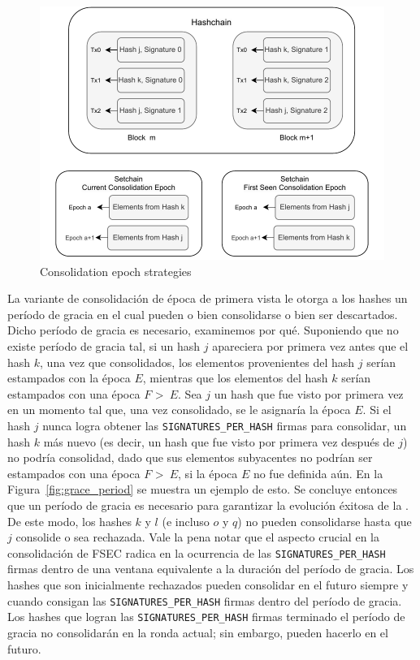 \begin{figure}
  \centering
  \includegraphics[scale=0.5]{figures/consolidation_epoch.pdf}
  \caption{Consolidation epoch strategies}
  \label{fig:consolidation_epoch}
\end{figure}

La variante de consolidación de época de primera vista le otorga a los hashes un período
de gracia en el cual pueden o bien consolidarse o bien ser descartados.
%
Dicho período de gracia es necesario, examinemos por qué.
Suponiendo que no existe período de gracia tal, si un hash $j$ apareciera por primera vez
antes que el hash $k$, una vez que consolidados, los elementos provenientes del hash $j$
serían estampados con la época $E$, mientras que los elementos del hash $k$ serían estampados
con una época $F$ \textgreater \ $E$.
%
Sea $j$ un hash que fue visto por primera vez en un momento tal que, una vez consolidado,
se le asignaría la época $E$.
%
Si el hash $j$ nunca logra obtener las \texttt{SIGNATURES\_PER\_HASH} firmas para
consolidar, un hash $k$ más nuevo (es decir, un hash que fue visto por primera vez
después de $j$) no podría consolidad, dado que sus elementos subyacentes no podrían ser
estampados con una época $F$ \textgreater \ $E$, si la época $E$ no fue definida aún.
%
En la Figura~\ref{fig:grace_period} se muestra un ejemplo de esto.
%
Se concluye entonces que un período de gracia es necesario para garantizar la evolución
éxitosa de la \hashchain. De este modo, los hashes $k$ y $l$ (e incluso $o$ y $q$) no
pueden consolidarse hasta que $j$ consolide o sea rechazada.
%
Vale la pena notar que el aspecto crucial en la consolidación de FSEC radica en la ocurrencia
de las \texttt{SIGNATURES\_PER\_HASH} firmas dentro de una ventana equivalente a la duración
del período de gracia.
%
Los hashes que son inicialmente rechazados pueden consolidar en el futuro siempre y cuando
consigan las \texttt{SIGNATURES\_PER\_HASH} firmas dentro del período de gracia.
%
Los hashes que logran las \texttt{SIGNATURES\_PER\_HASH} firmas terminado el período de gracia
no consolidarán en la ronda actual; sin embargo, pueden hacerlo en el futuro.

